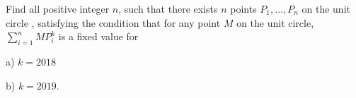 Find all positive integer $n$, such that there exists $n$ points $P_1,\ldots,P_n$ on the unit circle , satisfying the condition that for any point $M$ on the unit circle, $\sum_{i=1}^n MP_i^k$ is a fixed value for

a) $k=2018$

b) $k=2019$.